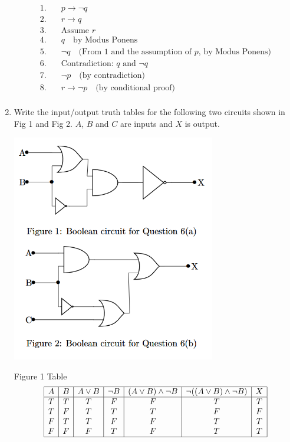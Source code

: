 \documentclass{article}
\begin{document}
\begin{enumerate}
\begin{center}
\end{center}
\begin{align*}
	1. \quad & p \rightarrow \neg q \quad \\
	2. \quad & r \rightarrow q \quad \\
	3. \quad & \text{Assume } r \quad \\
	4. \quad & q \quad \text{by Modus Ponens} \\
	5. \quad & \neg q \quad \text{(From 1 and the assumption of } p \text{, by Modus Ponens)} \\
	6. \quad & \text{Contradiction: } q \text{ and } \neg q \quad \\
	7. \quad & \neg p \quad \text{(by contradiction)} \\
	8. \quad & r \rightarrow \neg p \quad \text{(by conditional proof)} \\
\end{align*}
		
		
		\item Write the input/output truth tables for the following two circuits shown in Fig 1 and Fig 2. $A$, $B$ and $C$ are inputs and $X$ is output.
		
\begin{center}
\includegraphics[width=0.7\textwidth]{HW3_figures.png}
\end{center}
Figure 1 Table \\ 
\[
\begin{array}{|c|c|c|c|c|c|c|}
	\hline
	A & B & A \lor B & \neg B & (A \lor B) \land \neg B & \neg((A \lor B) \land \neg B) & X \\
	\hline
	T & T & T & F & F & T & T \\
	T & F & T & T & T & F & F \\
	F & T & T & F & F & T & T \\
	F & F & F & T & F & T & T \\
	\hline
\end{array}
\]


\end{enumerate}
\end{document}
